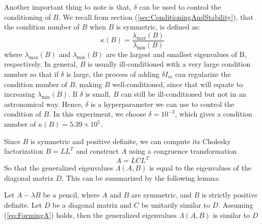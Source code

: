 Another important thing to note is that, $\delta$ can be used to control the conditioning of $B$. We recall from section (\ref{sec:ConditioningAndStability}), that the condition number of $B$ when $B$ is symmetric, is defined as:
\begin{equation}
	\kappa(B) = \frac{\lambda_{\max}(B)}{\lambda_{\min}(B)}
\end{equation}
where $\lambda_{\max}(B)$ and $\lambda_{\min}(B)$ are the largest and smallest eigenvalues of B, respectively.
In general, $B$ is usually ill-conditioned with a very large condition number so that if $\delta$ is large, the process of adding $\delta I_m$ can regularize the condition number of $B$, making $B$ well-conditioned, since that will equate to increasing $\lambda_{\min}(B)$. If $\delta$ is small, $B$ can still be ill-conditioned but not in an astronomical way. Hence, $\delta$ is a hyperparameter we can use to control the condition of $B$. In this experiment, we choose $\delta = 10^{-2}$, which gives a condition number of $\kappa(B) = 5.39 \times 10^5$.

Since $B$ is symmetric and positive definite, we can compute its Cholesky factorization $B = LL^T$ and construct $A$ using a congruence transformation
\begin{equation}\label{eq:FormingA}
	A = LCL^T
\end{equation}
So that the generalized eigenvalues $\Lambda(A, B)$ is equal to the eigenvalues of the diagonal matrix $D$. This can be summarized by the following lemma:
\begin{lemma}
	Let $A-\lambda B$ be a pencil, where $A$ and $B$ are symmetric, and $B$ is strictly positive definite. Let $D$ be a diagonal matrix and $C$ be unitarily similar to $D$. Assuming (\ref{eq:FormingA}) holds, then the generalized eigenvalues $\Lambda(A, B)$ is similar to $D$
\end{lemma}

